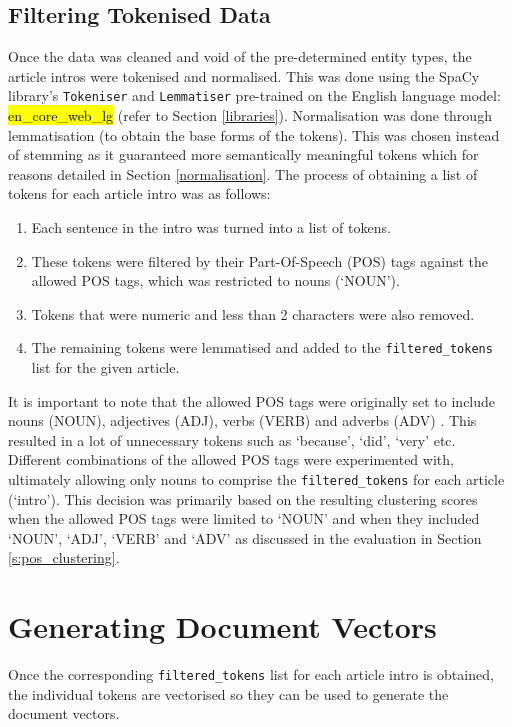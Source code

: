 \subsection{Filtering Tokenised Data} \label{filtered_tokens}
Once the data was cleaned and void of the pre-determined entity types, the article intros were tokenised and normalised. This was done using the SpaCy library's \texttt{Tokeniser} and \texttt{Lemmatiser} pre-trained on the English language model: \hl{en\_core\_web\_lg} (refer to Section \ref{libraries}). Normalisation was done through lemmatisation (to obtain the base forms of the tokens). This was chosen instead of stemming as it guaranteed more semantically meaningful tokens which for reasons detailed in Section \ref{normalisation}. The process of obtaining a list of tokens for each article intro was as follows:
\begin{enumerate}
    \item Each sentence in the intro was turned into a list of tokens.
    \item These tokens were filtered by their Part-Of-Speech (POS) tags against the allowed POS tags, which was restricted to nouns (`NOUN').
    \item Tokens that were numeric and less than 2 characters were also removed. 
    \item The remaining tokens were lemmatised and added to the \texttt{filtered\_tokens} list for the given article.
\end{enumerate}

It is important to note that the allowed POS tags were originally set to include nouns (NOUN), adjectives (ADJ), verbs (VERB) and adverbs (ADV) . This resulted in a lot of unnecessary tokens such as ‘because’, ‘did’, ‘very’ etc. Different combinations of the allowed POS tags were experimented with, ultimately allowing only nouns to comprise the \texttt{filtered\_tokens} for each article (`intro'). This decision was primarily based on the resulting clustering scores when the allowed POS tags were limited to `NOUN' and when they included `NOUN', `ADJ', `VERB' and `ADV' as discussed in the evaluation in Section \ref{s:pos_clustering}.

\section{Generating Document Vectors}

Once the corresponding \texttt{filtered\_tokens} list for each article intro is obtained, the individual tokens are vectorised so they can be used to generate the document vectors.

